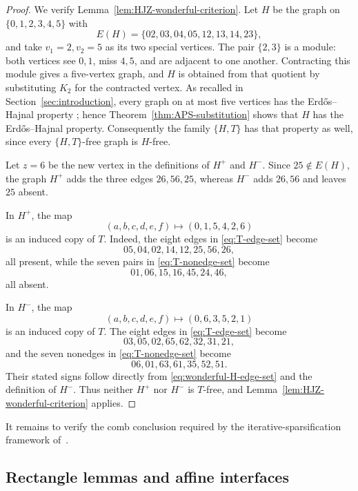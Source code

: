 \documentclass[11pt]{article}
\numberwithin{equation}{section}
\theoremstyle{plain}
\theoremstyle{definition}
\begin{document}
\begin{proof}
We verify Lemma~\ref{lem:HJZ-wonderful-criterion}.  Let $H$ be the
graph on $\{0,1,2,3,4,5\}$ with
\begin{equation}
 E(H)=\{02,03,04,05,12,13,14,23\},
 \label{eq:wonderful-H-edge-set}
\end{equation}
and take $v_1=2,v_2=5$ as its two special vertices.  The pair $\{2,3\}$
is a module: both vertices see $0,1$, miss $4,5$, and are adjacent to one
another.  Contracting this module gives a five-vertex graph, and $H$ is
obtained from that quotient by substituting $K_2$ for the contracted
vertex.  As recalled in Section~\ref{sec:introduction}, every graph on
at most five vertices has the Erd\H{o}s--Hajnal property
\cite{ChudnovskySafra2008,ChudnovskyScottSeymourSpirkl2023,
NguyenScottSeymourP5}; hence Theorem~\ref{thm:APS-substitution}
shows that $H$ has the
Erd\H{o}s--Hajnal property.  Consequently the family $\{H,T\}$ has that
property as well, since every $\{H,T\}$-free graph is $H$-free.

Let $z=6$ be the new vertex in the definitions of $H^+$ and $H^-$.  Since
$25\notin E(H)$, the graph $H^+$ adds the three edges $26,56,25$, whereas
$H^-$ adds $26,56$ and leaves $25$ absent.

In $H^+$, the map
\begin{equation*}
 (a,b,c,d,e,f)\longmapsto(0,1,5,4,2,6)
\end{equation*}
is an induced copy of $T$.  Indeed, the eight edges in
\eqref{eq:T-edge-set} become
\[
 05,04,02,14,12,25,56,26,
\]
all present, while the seven pairs in \eqref{eq:T-nonedge-set} become
\[
 01,06,15,16,45,24,46,
\]
all absent.

In $H^-$, the map
\begin{equation*}
 (a,b,c,d,e,f)\longmapsto(0,6,3,5,2,1)
\end{equation*}
is an induced copy of $T$.  The eight edges in
\eqref{eq:T-edge-set} become
\[
 03,05,02,65,62,32,31,21,
\]
and the seven nonedges in \eqref{eq:T-nonedge-set} become
\[
 06,01,63,61,35,52,51.
\]
Their stated signs follow directly from \eqref{eq:wonderful-H-edge-set}
and the definition of $H^-$.
Thus neither $H^+$ nor $H^-$ is $T$-free, and
Lemma~\ref{lem:HJZ-wonderful-criterion} applies.
\end{proof}

It remains to verify the comb conclusion required by the
iterative-sparsification framework of~\cite{HuangJuZhou2026}.

\subsection{Rectangle lemmas and affine interfaces}
\end{document}
